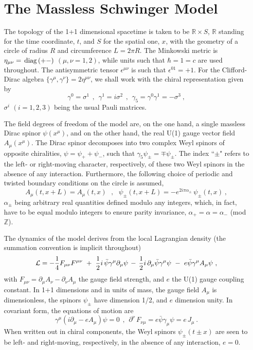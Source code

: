 \documentclass[a4paper,11pt]{article}
\def\R{\mathbb R}
\def\Z{\mathbb Z}
\begin{document}
\section{The Massless Schwinger Model}
\label{Sect2}

The topology of the 1+1 dimensional spacetime is taken to be $\R\times S$,
$\R$ standing for the time coordinate, $t$, and $S$ for the spatial one, $x$, 
with the geometry of a circle of radius $R$ and circumference $L=2\pi R$. The
Minkowski metric is $\eta_{\mu\nu}=\,{\rm diag}\,(+-)$
$(\mu,\nu=1,2)$, while units such that $\hbar=1=c$ are used throughout.
The antisymmetric tensor $\epsilon^{\mu\nu}$ is such that $\epsilon^{01}=+1$.
For the Clifford-Dirac algebra $\{\gamma^\mu,\gamma^\nu\}=2\eta^{\mu\nu}$,
we shall work with the chiral representation given by
\begin{equation}
\gamma^0=\sigma^1\ \ ,\ \ \gamma^1=i\sigma^2\ \ ,\ \ 
\gamma_5=\gamma^0\gamma^1=-\sigma^3\ ,
\end{equation}
$\sigma^i$ $(i=1,2,3)$ being the usual Pauli matrices.

The field degrees of freedom of the model are, on the one hand, a single
massless Dirac spinor $\psi(x^\mu)$, and on the other hand, the real U(1) 
gauge vector field $A_\mu(x^\mu)$. The Dirac spinor decomposes into two 
complex Weyl spinors of opposite chiralities, $\psi=\psi_++\psi_-$, such that 
$\gamma_5\psi_\pm=\mp\psi_\pm$. The index ``$\pm$" refers to the left- or 
right-moving character, respectively, of these two Weyl spinors
in the absence of any interaction. Furthermore, the following choice of 
periodic and twisted boundary conditions on the circle is assumed,
\begin{equation}
A_\mu(t,x+L)=A_\mu(t,x)\ \ \ ,\ \ \ 
\psi_\pm(t,x+L)=-e^{2i\pi\alpha_\pm}\,\psi_\pm(t,x)\ ,
\end{equation}
$\alpha_\pm$ being arbitrary real quantities defined modulo any integers,
which, in fact, have to be equal modulo integers to ensure parity invariance, 
$\alpha_+=\alpha=\alpha_-$ (mod $\Z$).

The dynamics of the model derives from the local Lagrangian density
(the summation convention is implicit throughout)
\begin{equation}
{\cal L}=-\frac{1}{4}F_{\mu\nu}F^{\mu\nu}\ +\
\frac{1}{2}i\,\bar{\psi}\gamma^\mu\partial_\mu\psi\,-\,
\frac{1}{2}i\,\partial_\mu\bar{\psi}\gamma^\mu\psi\ -\
e\bar{\psi}\gamma^\mu A_\mu\psi\ ,
\end{equation}
with $F_{\mu\nu}=\partial_\mu A_\nu-\partial_\nu A_\mu$ the gauge field 
strength, and $e$ the U(1) gauge coupling constant. In 1+1 dimensions and 
in units of mass, the gauge field $A_\mu$ is dimensionless, the spinors 
$\psi_\pm$ have dimension 1/2, and $e$ dimension unity. In covariant form, 
the equations of motion are
\begin{equation}
\gamma^\mu(i\partial_\mu-eA_\mu)\psi=0\ \ ,\ \ 
\partial^\nu\,F_{\nu\mu}=e\bar{\psi}\gamma_\mu\psi=e\,J_\mu\ .
\end{equation} 
When written out in chiral components, the Weyl spinors
$\psi_\pm(t\pm x)$ are seen to be left- and right-moving, respectively,
in the absence of any interaction, $e=0$.
\end{document}
